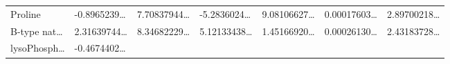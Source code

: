 \documentclass[
]{article}
\begin{document}
\begin{longtable}[]{@{}lllllll@{}}
\begin{minipage}[t]{0.12\columnwidth}
Proline\strut
\end{minipage} & \begin{minipage}[t]{0.12\columnwidth}\raggedright
-0.8965239\ldots{}\strut
\end{minipage} & \begin{minipage}[t]{0.12\columnwidth}\raggedright
7.70837944\ldots{}\strut
\end{minipage} & \begin{minipage}[t]{0.12\columnwidth}\raggedright
-5.2836024\ldots{}\strut
\end{minipage} & \begin{minipage}[t]{0.12\columnwidth}\raggedright
9.08106627\ldots{}\strut
\end{minipage} & \begin{minipage}[t]{0.12\columnwidth}\raggedright
0.00017603\ldots{}\strut
\end{minipage} & \begin{minipage}[t]{0.12\columnwidth}\raggedright
2.89700218\ldots{}\strut
\end{minipage}\tabularnewline
\begin{minipage}[t]{0.12\columnwidth}\raggedright
B-type nat\ldots{}\strut
\end{minipage} & \begin{minipage}[t]{0.12\columnwidth}\raggedright
2.31639744\ldots{}\strut
\end{minipage} & \begin{minipage}[t]{0.12\columnwidth}\raggedright
8.34682229\ldots{}\strut
\end{minipage} & \begin{minipage}[t]{0.12\columnwidth}\raggedright
5.12133438\ldots{}\strut
\end{minipage} & \begin{minipage}[t]{0.12\columnwidth}\raggedright
1.45166920\ldots{}\strut
\end{minipage} & \begin{minipage}[t]{0.12\columnwidth}\raggedright
0.00026130\ldots{}\strut
\end{minipage} & \begin{minipage}[t]{0.12\columnwidth}\raggedright
2.43183728\ldots{}\strut
\end{minipage}\tabularnewline
\begin{minipage}[t]{0.12\columnwidth}\raggedright
lysoPhosph\ldots{}\strut
\end{minipage} & \begin{minipage}[t]{0.12\columnwidth}\raggedright
-0.4674402\ldots{}\strut

\end{minipage}
\end{longtable}
\end{document}
